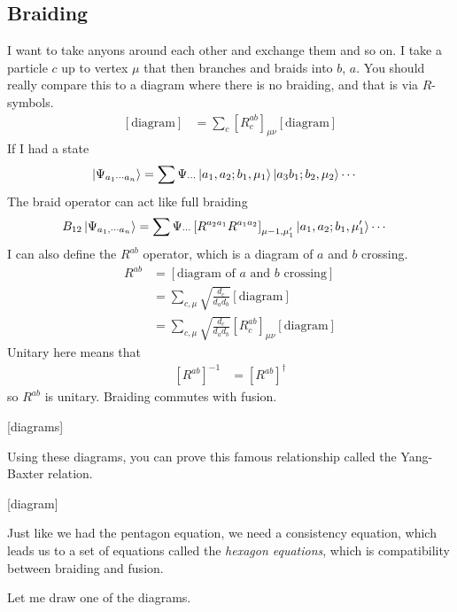 \subsection{Braiding}
I want to take anyons around each other and exchange them and so on.
I take a particle $c$ up to vertex $\mu$ that then branches and braids into $b$,
$a$.
You should really compare this to a diagram where there is no braiding,
and that is via $R$-symbols.
\begin{align}
    \left[ \text{diagram} \right]
    &=
    \sum_c \left[ R_c^{ab} \right]_{\mu\nu}
    \left[ \text{diagram} \right]
\end{align}
If I had a state
\begin{align}
    \ket{\Psi_{a_1\cdots a_n}}
    &=
    \sum
    \Psi_{\cdots}
    \ket{a_1,a_2;b_1,\mu_1}
    \ket{a_3b_1; b_2, \mu_2}\cdots
\end{align}
The braid operator can act like full braiding
\begin{align}
    B_{12}
    \ket{\Psi_{a_1,\cdots a_n}}
    &=
    \sum
    \Psi_{\cdots}
    \left[ 
    R^{a_2 a_1} R^{a_1 a_2}
    \right]_{\mu-1,\mu_1'}
    \ket{a_1,a_2; b_1, \mu_1'}
    \cdots
\end{align}
I can also define the $R^{ab}$ operator,
which is a diagram of $a$ and $b$ crossing.
\begin{align}
    R^{ab}
    &=
    [\text{diagram of $a$ and $b$ crossing}]\\
    &=
    \sum_{c,\mu}
    \sqrt{\frac{d_c}{d_a d_b}}
    [\text{diagram}]\\
    &=
    \sum_{c,\mu}
    \sqrt{\frac{d_c}{d_a d_b}}
    \left[ R_c^{ab} \right]_{\mu\nu}
    [\text{diagram}]
\end{align}
Unitary here means that
\begin{align}
    \left[ R^{ab} \right]^{-1}
    &=
    \left[ R^{ab} \right]^\dagger
\end{align}
so $R^{ab}$ is unitary.
Braiding commutes with fusion.

[diagrams]

Using these diagrams,
you can prove this famous relationship called the Yang-Baxter relation.

[diagram]

Just like we had the pentagon equation,
we need a consistency equation,
which leads us to a set of equations called the
\emph{hexagon equations},
which is compatibility between braiding and fusion.

Let me draw one of the diagrams.

